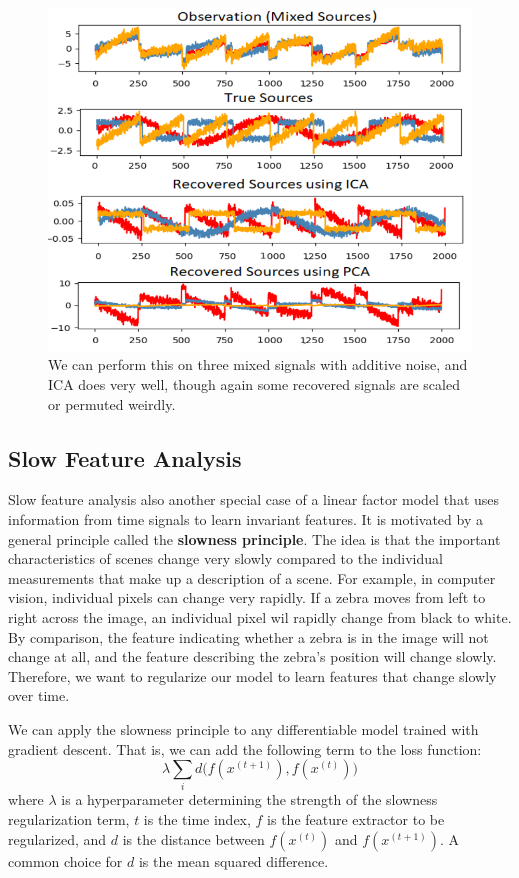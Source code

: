   \begin{figure}[H]
    \centering 
    \includegraphics[scale=0.4]{img/ICA_example.png}
    \caption{We can perform this on three mixed signals with additive noise, and ICA does very well, though again some recovered signals are scaled or permuted weirdly. }
    \label{fig:}
  \end{figure}

\subsection{Slow Feature Analysis}

  Slow feature analysis also another special case of a linear factor model that uses information from time signals to learn invariant features. It is motivated by a general principle called the \textbf{slowness principle}. The idea is that the important characteristics of scenes change very slowly compared to the individual measurements that make up a description of a scene. For example, in computer vision, individual pixels can change very rapidly. If a zebra moves from left to right across the image, an individual pixel wil rapidly change from black to white. By comparison, the feature indicating whether a zebra is in the image will not change at all, and the feature describing the zebra's position will change slowly. Therefore, we want to regularize our model to learn features that change slowly over time.  

  We can apply the slowness principle to any differentiable model trained with gradient descent. That is, we can add the following term to the loss function: 
  \begin{equation}
    \lambda \sum_i d\big( f(x^{(t+1)}), f(x^{(t)}) \big)
  \end{equation}
  where $\lambda$ is a hyperparameter determining the strength of the slowness regularization term, $t$ is the time index, $f$ is the feature extractor to be regularized, and $d$ is the distance between $f(x^{(t)})$ and $f(x^{(t+1)})$. A common choice for $d$ is the mean squared difference. 

